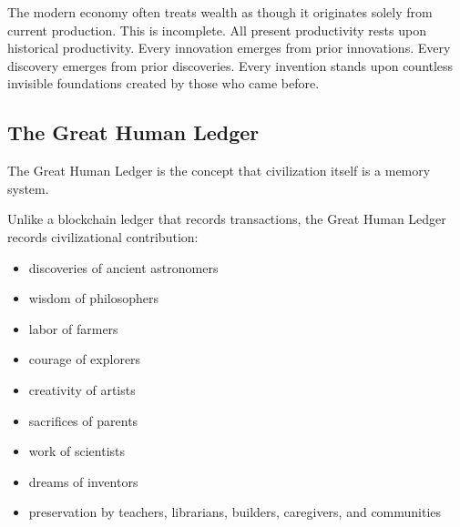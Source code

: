 ﻿\documentclass[12pt]{article}
\begin{document}
The modern economy often treats wealth as though it originates solely from current production. This is incomplete. All present productivity rests upon historical productivity. Every innovation emerges from prior innovations. Every discovery emerges from prior discoveries. Every invention stands upon countless invisible foundations created by those who came before.

\subsection{The Great Human Ledger}


The Great Human Ledger is the concept that civilization itself is a memory system.

Unlike a blockchain ledger that records transactions, the Great Human Ledger records civilizational contribution:

\begin{itemize}
  \item discoveries of ancient astronomers
\end{itemize}
\begin{itemize}
  \item wisdom of philosophers
\end{itemize}
\begin{itemize}
  \item labor of farmers
\end{itemize}
\begin{itemize}
  \item courage of explorers
\end{itemize}
\begin{itemize}
  \item creativity of artists
\end{itemize}
\begin{itemize}
  \item sacrifices of parents
\end{itemize}
\begin{itemize}
  \item work of scientists
\end{itemize}
\begin{itemize}
  \item dreams of inventors
\end{itemize}
\begin{itemize}
  \item preservation by teachers, librarians, builders, caregivers, and communities
\end{itemize}
\end{document}
